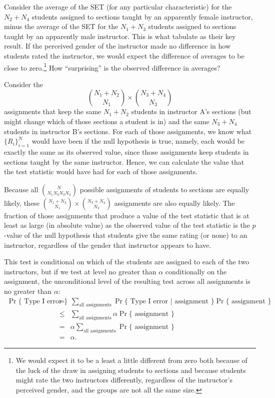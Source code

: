 \documentclass[12pt]{article}
\newcommand{\beq}{\begin{equation}}
\newcommand{\eeq}{\end{equation}}
\begin{document}
Consider the average of the SET (for any particular characteristic)
for the $N_2 + N_4$ students
assigned to sections taught by an apparently female instructor, minus the 
average of the SET for the $N_1 + N_3$ students
assigned to sections taught by an apparently male instructor.
This is what \cite{MacNell2014} tabulate as their key result.
If the perceived gender of the instructor made no difference in how students rated 
the instructor, we would expect the difference of averages to be close to
zero.\footnote{%
We would expect it to be a least a little different from zero both because of the luck of the draw
in assigning students to sections and because students might rate the two instructors
differently, regardless of the instructor's perceived gender, and the groups are not all the same size.
}
How ``surprising'' is the observed difference in averages?

Consider the
\beq
{{N_1 + N_2} \choose {N_1}} \times {{N_3+N_4} \choose {N_3}}
\eeq
assignments that keep the same $N_1 + N_2$ students in instructor A's
sections (but might change which of those sections a student is in) 
and the same $N_3 + N_4$ students in instructor B's sections.
For each of those assignments, we know what $\{R_i\}_{i=1}^N$ would
have been if the null hypothesis is true, namely, each would be exactly the same
as its observed value, since those
assignments keep students in sections taught by the same instructor.
Hence, we can calculate the value that the test statistic would have had for each
of those assignments.

Because all ${N}\choose{N_1 N_2 N_3 N_4}$ possible assignments of students
to sections are equally likely, these 
${{N_1 + N_2} \choose {N_1}} \times {{N_3+N_4} \choose {N_3}}$ 
assignments are also equally likely.
The fraction of those assignments that produce a value of the test statistic that
is at least as large (in absolute value) as the observed value of the test statistic
is the $p$-value of the null hypothesis that students give the same rating (or none) to
an instructor, regardless of the gender that instructor appears to have.

This test is conditional on which of the students are assigned to each of the two 
instructors, but if we test at level no greater than $\alpha$ conditionally on the
assignment, the unconditional level of the resulting test across all assignments is no 
greater than $\alpha$:
\begin{eqnarray}
   \Pr \{ \mbox{ Type I error } \} &=& \sum_{\mbox{all assignments}} \Pr \{ \mbox{ Type I error } | 
   \mbox{ assignment } \} \Pr\{\mbox{ assignment } \} \nonumber \\
   &\le& 
    \sum_{\mbox{all assignments}} \alpha \Pr\{\mbox{ assignment } \} \nonumber \\
    &=& \alpha \sum_{\mbox{all assignments}} \Pr\{\mbox{ assignment } \} \nonumber \\
    &=& \alpha.
\end{eqnarray}
\end{document}
